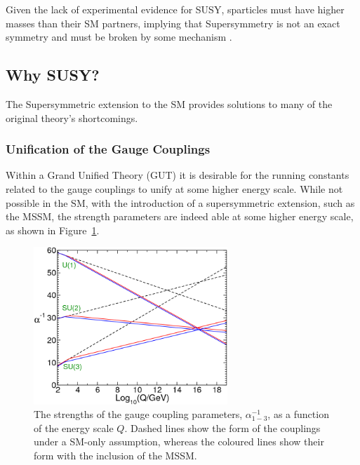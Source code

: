 Given the lack of experimental evidence for SUSY, sparticles must
have higher masses than their SM partners, implying that Supersymmetry is not
an exact symmetry and must be broken by some mechanism \cite{ref:hierarchy1,ref:hierarchy2}.

\subsection{Why SUSY?}
The Supersymmetric extension to the SM provides solutions to many of the
original theory's shortcomings.

\subsubsection{Unification of the Gauge Couplings}
Within a Grand Unified Theory (GUT) it is desirable
for the running constants related to the gauge couplings to unify at some
higher energy scale. While not possible in the SM, with the introduction of a
supersymmetric extension, such as the MSSM, the strength parameters are indeed able at
some higher energy scale, as shown in Figure~\ref{fig:uni_gauge}.

\begin{figure}[h!]
  \centering
  \includegraphics[width=0.65\textwidth]{Figs/susy/unification_primer.png}
  \caption{The strengths of the gauge coupling parameters,
  $\alpha^{-1}_{1-3}$, as a function of the energy scale $Q$. Dashed lines
  show the form of the couplings under a SM-only assumption, whereas the coloured
  lines show their form with the inclusion of the MSSM. \cite{Martin:1997ns}}
  \label{fig:uni_gauge}
\end{figure}

